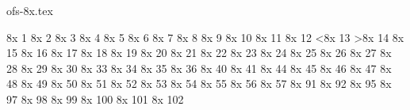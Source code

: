 

\protectreading ofs-8x.tex %

\characterdef \minusalt   8x   1
\characterdef \plusalt   8x   2
\characterdef \equalalt   8x   3
\characterdef \dividealt   8x   4
\characterdef \multiplyalt   8x   5
\characterdef \plusminusalt   8x   6
\characterdef \minusplusalt   8x   7
\characterdef \lessalt   8x   8
\characterdef \greateralt   8x   9
\characterdef \greaterequalaltpl   8x   10
\characterdef \lessequalaltpl   8x   11
\characterdef \textminusplus   8x   12
\characterdef \textless   8x   13
\characterdef \textgreater   8x   14
\characterdef \textlessequal   8x   15
\characterdef \textgreaterequal   8x   16
\characterdef \lessequalalt   8x   17
\characterdef \greaterequalalt   8x   18
\characterdef \dotlessisuperior   8x   19
\characterdef \onehalf   8x   20
\characterdef \onequarter   8x   21
\characterdef \onethird   8x   22
\characterdef \oneeighth   8x   23
\characterdef \threeeighths   8x   24
\characterdef \fiveeighths   8x   25
\characterdef \seveneighths   8x   26
\characterdef \threequarters   8x   27
\characterdef \twothirds   8x   28
\characterdef \ligfj   8x   29
\characterdef \ligffj   8x   30
\characterdef \ligst   8x   33
\characterdef \ligct   8x   34
\characterdef \ligTh   8x   35
\characterdef \dollarsuperior   8x   36
\characterdef \parenleftsuperior   8x   40
\characterdef \parenrightsuperior   8x   41
\characterdef \commasuperior   8x   44
\characterdef \hyphensuperior   8x   45
\characterdef \periodsuperior   8x   46
\characterdef \fraction   8x   47
\characterdef \zerosuperior   8x   48
\characterdef \onesuperior   8x   49
\characterdef \twosuperior   8x   50
\characterdef \threesuperior   8x   51
\characterdef \foursuperior   8x   52
\characterdef \fivesuperior   8x   53
\characterdef \sixsuperior   8x   54
\characterdef \sevensuperior   8x   55
\characterdef \eightsuperior   8x   56
\characterdef \ninesuperior   8x   57
\characterdef \sterlingsuperior   8x   91
\characterdef \yensuperior   8x   92
\characterdef \dotaccentsuperior   8x   95
\characterdef \asuperior   8x   97
\characterdef \bsuperior   8x   98
\characterdef \csuperior   8x   99
\characterdef \dsuperior   8x   100
\characterdef \esuperior   8x   101
\characterdef \fsuperior   8x   102
